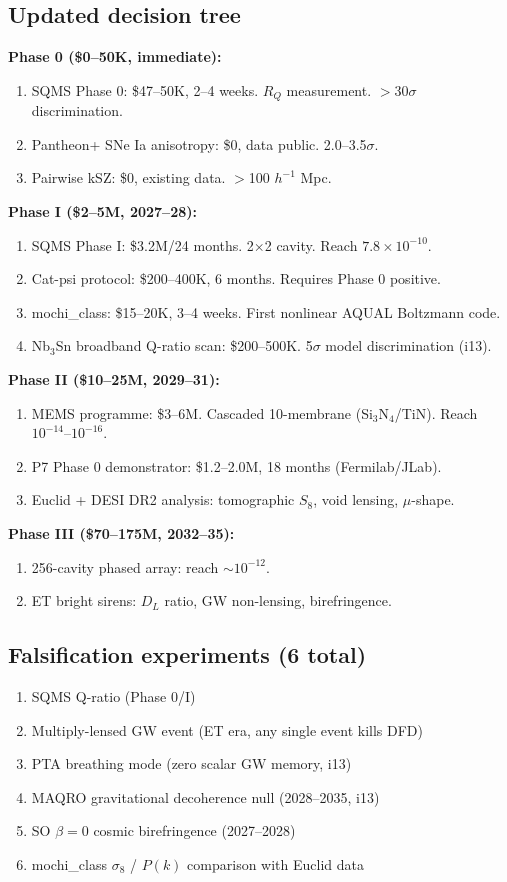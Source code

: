 \documentclass[11pt]{article}
\begin{document}
\subsection{Updated decision tree}

\textbf{Phase 0 (\$0--50K, immediate):}
\begin{enumerate}
\item SQMS Phase 0: \$47--50K, 2--4 weeks. $R_Q$ measurement. $>30\sigma$ discrimination.
\item Pantheon+ SNe Ia anisotropy: \$0, data public. 2.0--3.5$\sigma$.
\item Pairwise kSZ: \$0, existing data. $>$100 $h^{-1}$ Mpc.
\end{enumerate}

\textbf{Phase I (\$2--5M, 2027--28):}
\begin{enumerate}
\item SQMS Phase I: \$3.2M/24 months. 2$\times$2 cavity. Reach $7.8 \times 10^{-10}$.
\item Cat-psi protocol: \$200--400K, 6 months. Requires Phase 0 positive.
\item mochi\_class: \$15--20K, 3--4 weeks. First nonlinear AQUAL Boltzmann code.
\item Nb$_3$Sn broadband Q-ratio scan: \$200--500K. 5$\sigma$ model discrimination (i13).
\end{enumerate}

\textbf{Phase II (\$10--25M, 2029--31):}
\begin{enumerate}
\item MEMS programme: \$3--6M. Cascaded 10-membrane (Si$_3$N$_4$/TiN). Reach $10^{-14}$--$10^{-16}$.
\item P7 Phase 0 demonstrator: \$1.2--2.0M, 18 months (Fermilab/JLab).
\item Euclid + DESI DR2 analysis: tomographic $S_8$, void lensing, $\mu$-shape.
\end{enumerate}

\textbf{Phase III (\$70--175M, 2032--35):}
\begin{enumerate}
\item 256-cavity phased array: reach $\sim 10^{-12}$.
\item ET bright sirens: $D_L$ ratio, GW non-lensing, birefringence.
\end{enumerate}

\subsection{Falsification experiments (6 total)}
\begin{enumerate}
\item SQMS Q-ratio (Phase 0/I)
\item Multiply-lensed GW event (ET era, any single event kills DFD)
\item PTA breathing mode (zero scalar GW memory, i13)
\item MAQRO gravitational decoherence null (2028--2035, i13)
\item SO $\beta = 0$ cosmic birefringence (2027--2028)
\item mochi\_class $\sigma_8$ / $P(k)$ comparison with Euclid data
\end{enumerate}
\end{document}
